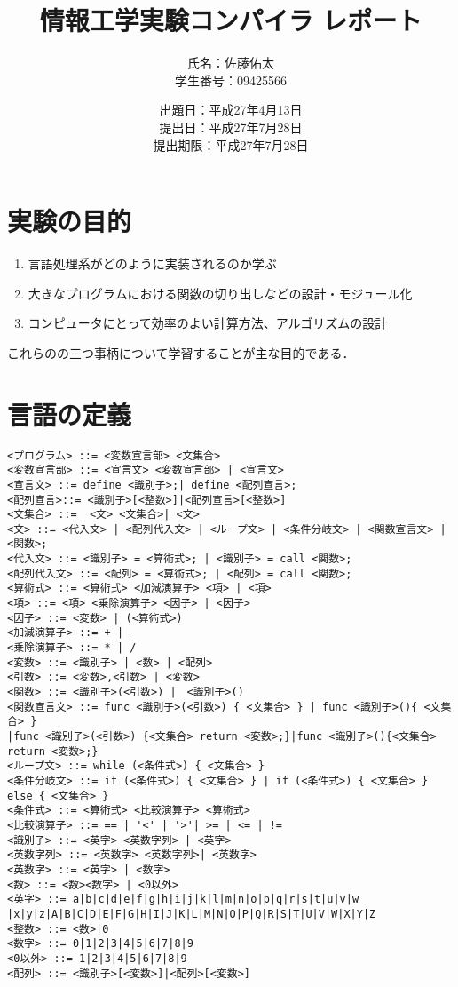 \documentclass[11pt,a4j]{jarticle}
\title{情報工学実験コンパイラ レポート}
\author{氏名：佐藤佑太\\学生番号：09425566}
\date{出題日：平成27年4月13日\\提出日：平成27年7月28日\\提出期限：平成27年7月28日}
\begin{document}
\maketitle
\newpage



\section{実験の目的}

\begin{enumerate}
\item {言語処理系がどのように実装されるのか学ぶ}
\item {大きなプログラムにおける関数の切り出しなどの設計・モジュール化}
\item {コンピュータにとって効率のよい計算方法、アルゴリズムの設計}
\end{enumerate}
これらのの三つ事柄について学習することが主な目的である．




\section{言語の定義}

{\baselineskip 2mm
\begin{verbatim}
<プログラム> ::= <変数宣言部> <文集合>
<変数宣言部> ::= <宣言文> <変数宣言部> | <宣言文>
<宣言文> ::= define <識別子>;| define <配列宣言>;
<配列宣言>::= <識別子>[<整数>]|<配列宣言>[<整数>]
<文集合> ::=  <文> <文集合>| <文>
<文> ::= <代入文> | <配列代入文> | <ループ文> | <条件分岐文> | <関数宣言文> | <関数>;
<代入文> ::= <識別子> = <算術式>; | <識別子> = call <関数>; 
<配列代入文> ::= <配列> = <算術式>; | <配列> = call <関数>;
<算術式> ::= <算術式> <加減演算子> <項> | <項>
<項> ::= <項> <乗除演算子> <因子> | <因子>
<因子> ::= <変数> | (<算術式>)
<加減演算子> ::= + | -
<乗除演算子> ::= * | /
<変数> ::= <識別子> | <数> | <配列>
<引数> ::= <変数>,<引数> | <変数>
<関数> ::= <識別子>(<引数>) |　<識別子>()
<関数宣言文> ::= func <識別子>(<引数>) { <文集合> } | func <識別子>(){ <文集合> }
|func <識別子>(<引数>) {<文集合> return <変数>;}|func <識別子>(){<文集合> return <変数>;}
<ループ文> ::= while (<条件式>) { <文集合> }
<条件分岐文> ::= if (<条件式>) { <文集合> } | if (<条件式>) { <文集合> } else { <文集合> }
<条件式> ::= <算術式> <比較演算子> <算術式>
<比較演算子> ::= == | '<' | '>'| >= | <= | !=
<識別子> ::= <英字> <英数字列> | <英字>
<英数字列> ::= <英数字> <英数字列>| <英数字>
<英数字> ::= <英字> | <数字>
<数> ::= <数><数字> | <0以外>
<英字> ::= a|b|c|d|e|f|g|h|i|j|k|l|m|n|o|p|q|r|s|t|u|v|w
|x|y|z|A|B|C|D|E|F|G|H|I|J|K|L|M|N|O|P|Q|R|S|T|U|V|W|X|Y|Z
<整数> ::= <数>|0
<数字> ::= 0|1|2|3|4|5|6|7|8|9
<0以外> ::= 1|2|3|4|5|6|7|8|9
<配列> ::= <識別子>[<変数>]|<配列>[<変数>]
\end{verbatim}}
\end{document}
